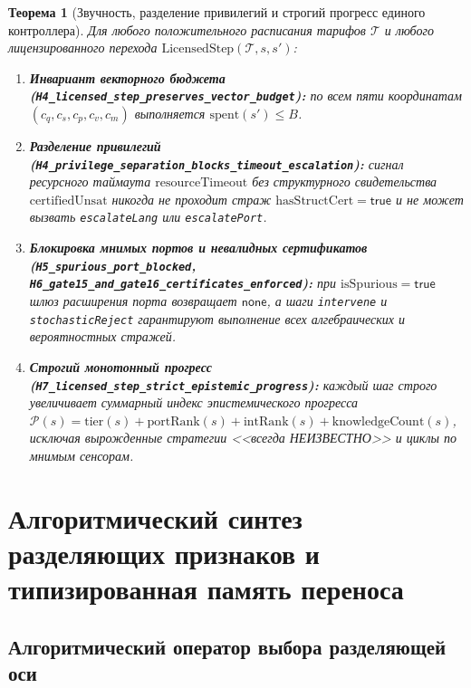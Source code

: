 \documentclass[11pt,a4paper]{article}
\theoremstyle{cleanthm}
\newtheorem{theorem}{Теорема}[section]
\theoremstyle{cleandef}
\begin{document}
\begin{theorem}[Звучность, разделение привилегий и строгий прогресс единого контроллера]
\label{thm:h4_h7_controller}
Для любого положительного расписания тарифов $\mathcal{T}$ и любого лицензированного перехода $\mathrm{LicensedStep}(\mathcal{T}, s, s')$:
\begin{enumerate}
  \item \textbf{Инвариант векторного бюджета (\texttt{H4\_licensed\_\allowbreak step\_\allowbreak preserves\_\allowbreak vector\_\allowbreak budget}):} по всем пяти координатам $(c_q,c_s,c_p,c_v,c_m)$ выполняется $\mathrm{spent}(s') \le B$.
  \item \textbf{Разделение привилегий (\texttt{H4\_privilege\_\allowbreak separation\_\allowbreak blocks\_\allowbreak timeout\_\allowbreak escalation}):} сигнал ресурсного таймаута $\mathrm{resourceTimeout}$ без структурного свидетельства $\mathrm{certifiedUnsat}$ никогда не проходит страж $\mathrm{hasStructCert}=\mathsf{true}$ и не может вызвать \texttt{escalateLang} или \texttt{escalatePort}.
  \item \textbf{Блокировка мнимых портов и невалидных сертификатов (\texttt{H5\_spurious\_\allowbreak port\_\allowbreak blocked}, \texttt{H6\_gate15\_\allowbreak and\_\allowbreak gate16\_\allowbreak certificates\_\allowbreak enforced}):} при $\mathrm{isSpurious}=\mathsf{true}$ шлюз расширения порта возвращает $\mathsf{none}$, а шаги \texttt{intervene} и \texttt{stochasticReject} гарантируют выполнение всех алгебраических и вероятностных стражей.
  \item \textbf{Строгий монотонный прогресс (\texttt{H7\_licensed\_\allowbreak step\_\allowbreak strict\_\allowbreak epistemic\_\allowbreak progress}):} каждый шаг строго увеличивает суммарный индекс эпистемического прогресса $\mathcal{P}(s) = \mathrm{tier}(s) + \mathrm{portRank}(s) + \mathrm{intRank}(s) + \mathrm{knowledgeCount}(s)$, исключая вырожденные стратегии <<всегда НЕИЗВЕСТНО>> и циклы по мнимым сенсорам.
\end{enumerate}
\end{theorem}

\section{Алгоритмический синтез разделяющих признаков и типизированная память переноса}

\subsection{Алгоритмический оператор выбора разделяющей оси}
\end{document}
